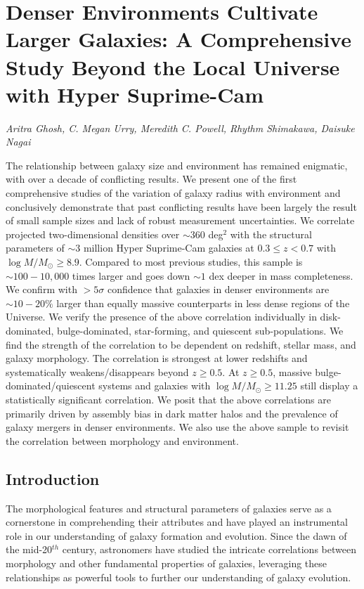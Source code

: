 \chapter{Denser Environments Cultivate Larger Galaxies: A Comprehensive Study Beyond the Local Universe with Hyper Suprime-Cam} \label{chap:morph_den}

{\large \emph{Aritra Ghosh, C. Megan Urry, Meredith C. Powell, Rhythm Shimakawa, Daisuke Nagai}} 


The relationship between galaxy size and environment has remained enigmatic, with over a decade of conflicting results. %
We present one of the first comprehensive studies of the variation of galaxy radius with environment and conclusively demonstrate that past conflicting results have been largely the result of small sample sizes and lack of robust measurement uncertainties. We correlate projected two-dimensional densities over $\sim360$ deg$^2$ with the structural parameters of $\sim3$ million Hyper Suprime-Cam galaxies at $0.3 \leq z < 0.7$ with $\log M/M_{\odot} \geq 8.9$. Compared to most previous studies, this sample is $\sim100-10,000$ times larger and goes down $\sim1$ dex deeper in mass completeness. We confirm with $>5\sigma$ confidence that galaxies in denser environments are $\sim10-20\%$ larger than equally massive counterparts in less dense regions of the Universe. We verify the presence of the above correlation individually in disk-dominated, bulge-dominated, star-forming, and quiescent sub-populations. We find the strength of the correlation to be dependent on redshift, stellar mass, and galaxy morphology. The correlation is strongest at lower redshifts and systematically weakens/disappears beyond $z \geq 0.5$. At $z\geq0.5$, massive bulge-dominated/quiescent systems and galaxies with $\log M/M_{\odot} \geq 11.25$ still display a statistically significant correlation. We posit that the above correlations are primarily driven by assembly bias in dark matter halos and the prevalence of galaxy mergers in denser environments. We also use the above sample to revisit the correlation between morphology and environment.  


\section{Introduction} \label{sec_c4:intro}

The morphological features and structural parameters of galaxies serve as a cornerstone in comprehending their attributes and have played an instrumental role in our understanding of galaxy formation and evolution. Since the dawn of the mid-20$^{th}$ century, astronomers have studied the intricate correlations between morphology and other fundamental properties of galaxies, leveraging these relationships as powerful tools to further our understanding of galaxy evolution.

